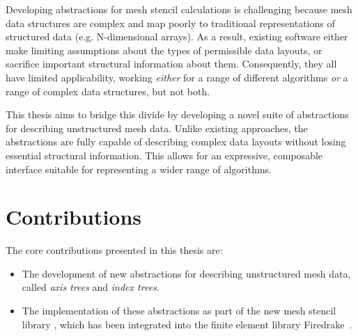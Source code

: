 \documentclass[thesis]{subfiles}
\begin{document}
Developing abstractions for mesh stencil calculations is challenging because mesh data structures are complex and map poorly to traditional representations of structured data (e.g. N-dimensional arrays).
As a result, existing software either make limiting assumptions about the types of permissible data layouts, or sacrifice important structural information about them.
Consequently, they all have limited applicability, working \emph{either} for a range of different algorithms \emph{or} a range of complex data structures, but not both.

This thesis aims to bridge this divide by developing a novel suite of abstractions for describing unstructured mesh data.
Unlike existing approaches, the abstractions are fully capable of describing complex data layouts without losing essential structural information.
This allows for an expressive, composable interface suitable for representing a wider range of algorithms.

\section{Contributions}
\label{sec:intro_contributions}

The core contributions presented in this thesis are:
\begin{itemize}
  \item The development of new abstractions for describing unstructured mesh data, called \emph{axis trees} and \emph{index trees}.
  \item The implementation of these abstractions as part of the new mesh stencil library , which has been integrated into the finite element library Firedrake~\cite{FiredrakeUserManual}.
\end{itemize}
\end{document}
